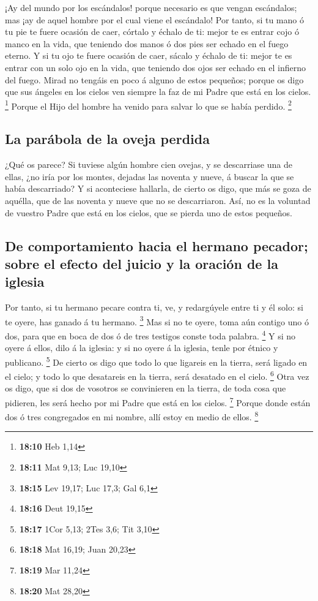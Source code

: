  ¡Ay del mundo por los escándalos! porque necesario es que
vengan escándalos; mas ¡ay de aquel hombre por el cual viene el
escándalo!  Por tanto, si tu mano ó tu pie te fuere ocasión
de caer, córtalo y échalo de ti: mejor te es entrar cojo ó manco en la
vida, que teniendo dos manos ó dos pies ser echado en el fuego eterno.
 Y si tu ojo te fuere ocasión de caer, sácalo y échalo de
ti: mejor te es entrar con un solo ojo en la vida, que teniendo dos ojos
ser echado en el infierno del fuego.  Mirad no tengáis en
poco á alguno de estos pequeños; porque os digo que sus ángeles en los
cielos ven siempre la faz de mi Padre que está en los cielos.
\footnote{\textbf{18:10} Heb 1,14}  Porque el Hijo del
hombre ha venido para salvar lo que se había perdido. \footnote{\textbf{18:11}
  Mat 9,13; Luc 19,10}

\hypertarget{la-paruxe1bola-de-la-oveja-perdida}{%
\subsection{La parábola de la oveja
perdida}\label{la-paruxe1bola-de-la-oveja-perdida}}

 ¿Qué os parece? Si tuviese algún hombre cien ovejas, y se
descarriase una de ellas, ¿no iría por los montes, dejadas las noventa y
nueve, á buscar la que se había descarriado?  Y si
aconteciese hallarla, de cierto os digo, que más se goza de aquélla, que
de las noventa y nueve que no se descarriaron.  Así, no es
la voluntad de vuestro Padre que está en los cielos, que se pierda uno
de estos pequeños.

\hypertarget{de-comportamiento-hacia-el-hermano-pecador-sobre-el-efecto-del-juicio-y-la-oraciuxf3n-de-la-iglesia}{%
\subsection{De comportamiento hacia el hermano pecador; sobre el efecto
del juicio y la oración de la
iglesia}\label{de-comportamiento-hacia-el-hermano-pecador-sobre-el-efecto-del-juicio-y-la-oraciuxf3n-de-la-iglesia}}

 Por tanto, si tu hermano pecare contra ti, ve, y
redargúyele entre ti y él solo: si te oyere, has ganado á tu hermano.
\footnote{\textbf{18:15} Lev 19,17; Luc 17,3; Gal 6,1}  Mas
si no te oyere, toma aún contigo uno ó dos, para que en boca de dos ó de
tres testigos conste toda palabra. \footnote{\textbf{18:16} Deut 19,15}
 Y si no oyere á ellos, dilo á la iglesia: y si no oyere á
la iglesia, tenle por étnico y publicano. \footnote{\textbf{18:17} 1Cor
  5,13; 2Tes 3,6; Tit 3,10}  De cierto os digo que todo lo
que ligareis en la tierra, será ligado en el cielo; y todo lo que
desatareis en la tierra, será desatado en el cielo. \footnote{\textbf{18:18}
  Mat 16,19; Juan 20,23}  Otra vez os digo, que si dos de
vosotros se convinieren en la tierra, de toda cosa que pidieren, les
será hecho por mi Padre que está en los cielos. \footnote{\textbf{18:19}
  Mar 11,24}  Porque donde están dos ó tres congregados en
mi nombre, allí estoy en medio de ellos. \footnote{\textbf{18:20} Mat
  28,20}

